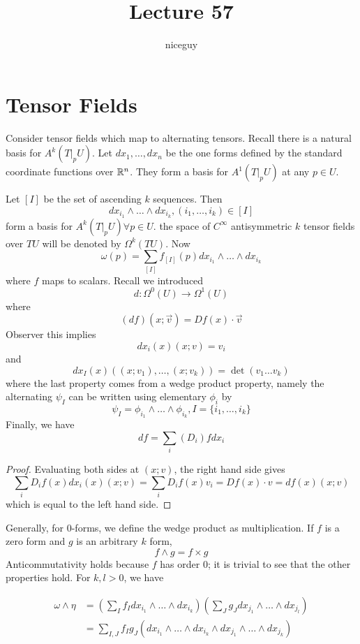 \documentclass[12pt]{article}
\title{Lecture 57}
\author{niceguy}
\begin{document}
\maketitle

\section{Tensor Fields}

Consider tensor fields which map to alternating tensors. Recall there is a natural basis for $A^k(T|_pU)$. Let $dx_1,\dots,dx_n$ be the one forms defined by the standard coordinate functions over $\mathbb{R}^n$. They form a basis for $A^1(T|_pU)$ at any $p \in U$.

Let $[I]$ be the set of ascending $k$ sequences. Then
$$dx_{i_1} \wedge \dots \wedge dx_{i_k}, (i_1,\dots,i_k) \in [I]$$
form a basis for $A^k(T|_pU) \forall p \in U$. the space of $C^\infty$ antisymmetric $k$ tensor fields over $TU$ will be denoted by $\Omega^k(TU)$. Now
$$\omega(p) = \sum_{[I]} f_{[I]}(p) dx_{i_1} \wedge \dots \wedge dx_{i_k}$$
where $f$ maps to scalars. Recall we introduced
$$d: \Omega^0(U) \rightarrow \Omega^1(U)$$
where
$$(df)(x;\vec v) = Df(x) \cdot \vec v$$
Observer this implies
$$dx_i(x)(x;v) = v_i$$
and
$$dx_I(x)((x;v_1),\dots,(x;v_k)) = \det(v_1\dots v_k)$$
where the last property comes from a wedge product property, namely the alternating $\psi_I$ can be written using elementary $\phi_i$ by
$$\psi_I = \phi_{i_1} \wedge \dots \wedge \phi_{i_k}, I = \{i_1,\dots,i_k\}$$
Finally, we have
$$df = \sum_i (D_i)fdx_i$$

\begin{proof}
    Evaluating both sides at $(x;v)$, the right hand side gives
    $$\sum_i D_if(x)dx_i(x)(x;v) = \sum_i D_if(x)v_i = Df(x) \cdot v = df(x)(x;v)$$
    which is equal to the left hand side.
\end{proof}

Generally, for 0-forms, we define the wedge product as multiplication. If $f$ is a zero form and $g$ is an arbitrary $k$ form,
$$f \wedge g = f \times g$$
Anticommutativity holds because $f$ has order 0; it is trivial to see that the other properties hold. For $k, l > 0$, we have

\begin{align*}
    \omega \wedge \eta &= \left(\sum_I f_I dx_{i_1} \wedge \dots \wedge dx_{i_k}\right) \left(\sum_J g_J dx_{j_1} \wedge \dots \wedge dx_{j_l}\right) \\
                       &= \sum_{I,J} f_Ig_J\left(dx_{i_1} \wedge \dots \wedge dx_{i_k} \wedge dx_{j_1} \wedge \dots \wedge dx_{j_k}\right)
\end{align*}
\end{document}
